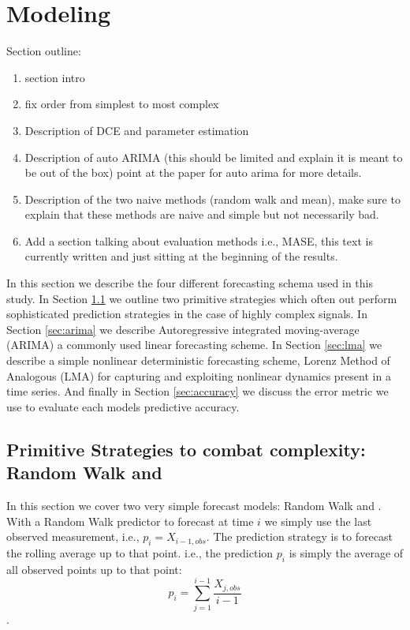 \section{Modeling}\label{sec:model}


Section outline:

\begin{enumerate}
\item \cmark section intro
\item \cmark fix order from simplest to most complex
\item Description of DCE and parameter estimation  
\item Description of auto ARIMA 
\subitem (this should be limited and explain it is meant to be out of the box) point at the paper for auto arima for more details.
\item \cmark Description of the two naive methods (random walk and mean), make sure to explain that these methods are naive and simple but not necessarily bad.
\item\cmark Add a section talking about evaluation methods i.e., MASE, this text is currently written and just sitting at the beginning of the results. 

\end{enumerate}

In this section we describe the four different forecasting schema used in this study. In Section \ref{sec:simple} we outline two primitive strategies which often out perform sophisticated prediction strategies in the case of highly complex signals. In Section \ref{sec:arima} we describe Autoregressive integrated moving-average (ARIMA) a commonly used linear forecasting scheme. In Section \ref{sec:lma} we describe a simple nonlinear deterministic forecasting scheme, Lorenz Method of Analogous (LMA) for capturing and exploiting nonlinear dynamics present in a time series. And finally in Section \ref{sec:accuracy} we discuss the error metric we use to evaluate each models predictive accuracy.



\subsection{Primitive Strategies to combat complexity: Random Walk and \naive}\label{sec:simple}
In this section we cover two very simple forecast models: Random Walk and \naive. With a Random Walk predictor to forecast at time $i$ we simply use the last observed measurement, i.e., $p_i = X_{i-1,obs}$. The \naive prediction strategy is to forecast the rolling average up to that point. i.e., the prediction $p_i$ is simply the average of all observed points up to that point: $$p_i = \sum_{j=1}^{i-1}\frac{X_{j,obs}}{i-1}$$.

